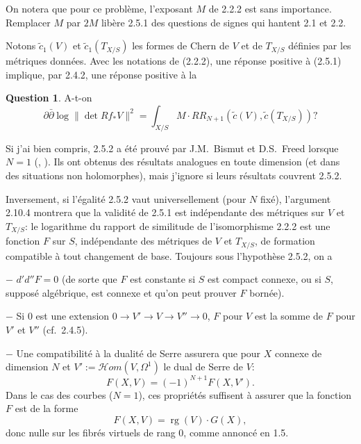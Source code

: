\documentclass[12pt,a4paper]{article}
\theoremstyle{plain}
\theoremstyle{definition}
\newtheorem{question}[theorem]{Question}
\DeclareMathOperator{\rank}{rg}
\begin{document}
On notera que pour ce probl\`eme, l'exposant $M$ de 2.2.2 est sans importance.
Remplacer $M$ par $2M$ lib\`ere 2.5.1 des questions de signes qui hantent 2.1 et
2.2.

Notons $\tilde{c}_1(V)$ et $\tilde{c}_1(T_{X/S})$ les formes de Chern de $V$ et de $T_{X/S}$ d\'efinies
par les m\'etriques donn\'ees. Avec les notations de (2.2.2), une r\'eponse positive
\`a (2.5.1) implique, par 2.4.2, une r\'eponse positive \`a la

\begin{question}
A-t-on
\[
\partial \bar\partial \log \|\det Rf_* V\|^2 = \textstyle \int_{X/S} M \cdot RR_{N+1}(\tilde{c}(V), \tilde{c}(T_{X/S}))?
\]
\end{question}

Si j'ai bien compris, 2.5.2 a \'et\'e prouv\'e par J.M.~Bismut et D.S.~Freed lorsque
$N = 1$ (\cite{3}, \cite{6}). Ils ont obtenus des r\'esultats analogues en toute dimension (et dans des situations
non holomorphes), mais j'ignore si leurs r\'esultats couvrent 2.5.2.

Inversement, si l'\'egalit\'e 2.5.2 vaut universellement (pour $N$ fix\'e), l'argument
2.10.4 montrera que la validit\'e de 2.5.1 est ind\'ependante des m\'etriques sur $V$ et
$T_{X/S}$: le logarithme du rapport de similitude de l'isomorphisme 2.2.2 est une
fonction $F$ sur $S$, ind\'ependante des m\'etriques de $V$ et $T_{X/S}$, de formation
compatible \`a tout changement de base. Toujours sous l'hypoth\`ese 2.5.2, on a

$-$ $d'd''F = 0$ (de sorte que $F$ est constante si $S$ est compact connexe,
ou si $S$, suppos\'e alg\'ebrique, est connexe et qu'on peut prouver $F$ born\'ee).

$-$ Si $0$ est une extension $0 \to V' \to V \to V'' \to 0$, $F$ pour $V$ est la somme
de $F$ pour $V'$ et $V''$ (cf.~2.4.5).

$-$ Une compatibilit\'e \`a la dualit\'e de Serre assurera que pour $X$ connexe de dimension
$N$ et $V' := \mathscr{H}om(V, \Omega^1)$ le dual de Serre de $V$:
\[
F(X,V) = (-1)^{N+1} F(X,V') .
\]
Dans le cas des courbes ($N=1$), ces propri\'et\'es suffisent \`a assurer que la fonction
$F$ est de la forme
\[
F(X,V) = \rank(V) \cdot G(X) ,
\]
donc nulle sur les fibr\'es virtuels de rang 0, comme annonc\'e en 1.5.

\subsection{}
\end{document}
